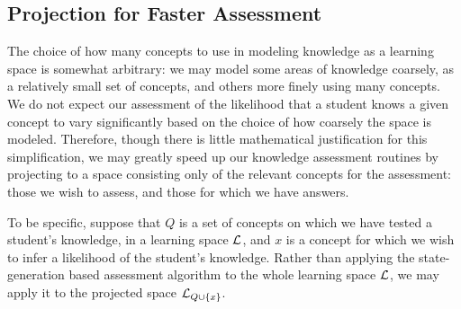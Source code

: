 \documentclass[11pt]{llncs}
\begin{document}
{\subsection{Projection for Faster Assessment}

The choice of how many concepts to use in modeling knowledge as a learning space is somewhat arbitrary: we may model some areas of knowledge coarsely, as a relatively small set of concepts, and others more finely using many concepts. We do not expect our assessment of the likelihood that a student knows a given concept to vary significantly based on the choice of how coarsely the space is modeled. Therefore, though there is little mathematical justification for this simplification, we may greatly speed up our knowledge assessment routines by projecting to a space consisting only of the relevant concepts for the assessment: those we wish to assess, and those for which we have answers.

To be specific, suppose that $Q$ is a set of concepts on which we have tested a student's knowledge, in a learning space $\cal L$, and $x$ is a concept for which we wish to infer a likelihood of the student's knowledge.
Rather than applying the state-generation based assessment algorithm to the whole learning space $\cal L$, we may apply it to the projected space ${\cal L}_{Q\cup\{x\}}$.

}
\end{document}
